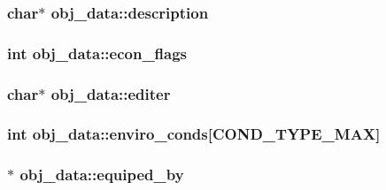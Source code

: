 \hypertarget{structobj__data_a1fd194539b4ab06132502f3d385c7384}{
\subsubsection[{description}]{\setlength{\rightskip}{0pt plus 5cm}char$\ast$ obj\-\_\-data\-::description}}\label{structobj__data_a1fd194539b4ab06132502f3d385c7384}
\hypertarget{structobj__data_a1d037ddb21556a101866d850c75d583b}{
\subsubsection[{econ\-\_\-flags}]{\setlength{\rightskip}{0pt plus 5cm}int obj\-\_\-data\-::econ\-\_\-flags}}\label{structobj__data_a1d037ddb21556a101866d850c75d583b}
\hypertarget{structobj__data_a72f19d1644d95b9629572f77eb201cdf}{
\subsubsection[{editer}]{\setlength{\rightskip}{0pt plus 5cm}char$\ast$ obj\-\_\-data\-::editer}}\label{structobj__data_a72f19d1644d95b9629572f77eb201cdf}
\hypertarget{structobj__data_a96a86c009fc0ab1166a4cd812074ab93}{
\subsubsection[{enviro\-\_\-conds}]{\setlength{\rightskip}{0pt plus 5cm}int obj\-\_\-data\-::enviro\-\_\-conds\mbox{[}{\bf C\-O\-N\-D\-\_\-\-T\-Y\-P\-E\-\_\-\-M\-A\-X}\mbox{]}}}\label{structobj__data_a96a86c009fc0ab1166a4cd812074ab93}
\hypertarget{structobj__data_a80ed7ef3f58646168c9c876596d4abcd}{
\subsubsection[{equiped\-\_\-by}]{$\ast$ obj\-\_\-data\-::equiped\-\_\-by}}\label{structobj__data_a80ed7ef3f58646168c9c876596d4abcd}
